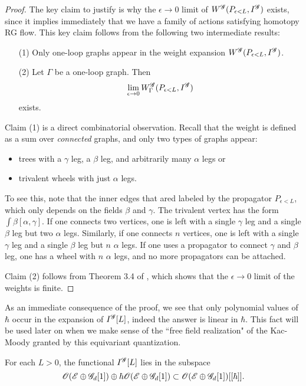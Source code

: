 \begin{proof}
The key claim to justify is why the $\epsilon \to 0$ limit of $W^{\mathscr G} (P_{\epsilon<L} , I^{\mathscr G})$ exists,
since it implies immediately that we have a family of actions satisfying homotopy RG flow. 
This key claim follows from the following two intermediate results:
\begin{itemize}
\item[(1)] 
Only one-loop graphs appear in the weight expansion $W^{\mathscr G} (P_{\epsilon < L}, I^{\mathscr G})$. 

\item[(2)] Let $\Gamma$ be a one-loop graph.
Then
\[
\lim_{\epsilon \to 0} W^{\mathscr G}_\Gamma(P_{\epsilon < L}, I^{\mathscr G})
\]
exists.
\end{itemize}

Claim (1) is a direct combinatorial observation.
Recall that the weight is defined as a sum over {\em connected} graphs,
and only two types of graphs appear: 
\begin{itemize}
\item trees with a $\gamma$ leg, a $\beta$ leg, and arbitrarily many $\alpha$ legs or
\item trivalent wheels with just $\alpha$ legs.
\end{itemize}
To see this, note that the inner edges that ared labeled by the propagator $P_{\epsilon < L}$, which only depends on the fields $\beta$ and $\gamma$. 
The trivalent vertex has the form $\int \beta [\alpha, \gamma]$.
If one connects two vertices, one is left with a single $\gamma$ leg and a single $\beta$ leg but two $\alpha$ legs.
Similarly, if one connects $n$ vertices, one is left  with a single $\gamma$ leg and a single $\beta$ leg but $n$ $\alpha$ legs.
If one uses a propagator to connect $\gamma$ and $\beta$ leg, one has a wheel with $n$ $\alpha$ legs,
and no more propagators can be attached.

Claim (2) follows from Theorem 3.4 of \cite{BWhol}, which shows that the $\epsilon \to 0$ limit of the weights is finite. 
\end{proof}

As an immediate consequence of the proof, we see that only polynomial values of $\hbar$ occur in the expansion of $I^{\mathscr G}[L]$, indeed the answer is linear in $\hbar$. 
This fact will be used later on when we make sense of the ``free field realization" of the Kac-Moody granted by this equivariant quantization. 

\begin{cor}
For each $L > 0$, the functional $I^{\mathscr G}[L]$ lies in the subspace 
\[
\mathscr O(\mathscr E \oplus \mathscr G_d[1]) \oplus \hbar \mathscr O(\mathscr E \oplus \mathscr G_d[1]) \subset \mathscr O(\mathscr E \oplus \mathscr G_d[1]) [[\hbar]].
\] 
\end{cor}

